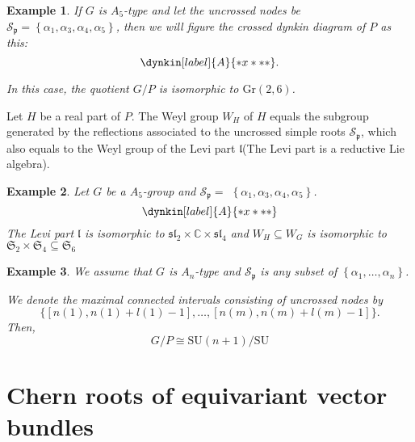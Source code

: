 \documentclass[uplatex,dvipdfmx]{jsarticle}
\newtheorem{example}{Example}[section]
\begin{document}
\begin{example}
    If
    $G$
    is
    $A_5$-type
    and let the uncrossed nodes be
    $\mathcal{S}_{\mathfrak{p}} = \left\{ \alpha_1, \alpha_3, \alpha_4, \alpha_5 \right\}$,
    then we will figure the crossed dynkin diagram of
    $P$
    as this:
    \begin{equation}
        \dynkin[label]{A}{*x***}.
    \end{equation}

    In this case, the quotient
    $G/P$
    is isomorphic to
    $\mathrm{Gr}\left( 2, 6 \right)$.
\end{example}

Let
$H$
be a real part of
$P$.
The Weyl group 
$W_H$
of
$H$
equals the subgroup generated by the reflections associated to the uncrossed simple roots
$\mathcal{S}_\mathfrak{p}$,
which also equals to the Weyl group of the Levi part
$\mathfrak{l}$(The Levi part is a reductive Lie algebra).

\begin{example}
    Let 
    $G$ 
    be a 
    $A_5$-group
    and 
    $\mathcal{S}_{\mathfrak{p}} =$    
    $\left\{ \alpha_1, \alpha_3, \alpha_4, \alpha_5 \right\}$.
    \begin{equation*}
        \dynkin[label]{A}{*x***}
    \end{equation*}
    The Levi part
    $\mathfrak{l}$
    is isomorphic to
    $\mathfrak{sl}_2 \times \mathbb{C} \times \mathfrak{sl}_4$
    and
    $W_H \subseteq W_G$
    is isomorphic to
    $\mathfrak{S}_2 \times \mathfrak{S}_4 \subseteq \mathfrak{S}_6$
\end{example}


\begin{example}
    We assume that
    $G$
    is
    $A_n$-type
    and
    $\mathcal{S}_\mathfrak{p}$
    is any subset of 
    $\left\{\alpha_1, \ldots, \alpha_n \right\}$.

    We denote the maximal connected intervals consisting of uncrossed nodes by
    \begin{equation}
        \{[n(1), n(1) + l(1) - 1], \ldots, [n(m), n(m) + l(m) - 1]\}.
    \end{equation}
    Then,
    \begin{equation}
        G/P \cong \mathrm{SU}(n+1)/\mathrm{SU}
    \end{equation}
\end{example}

\section{Chern roots of equivariant vector bundles}
\end{document}
